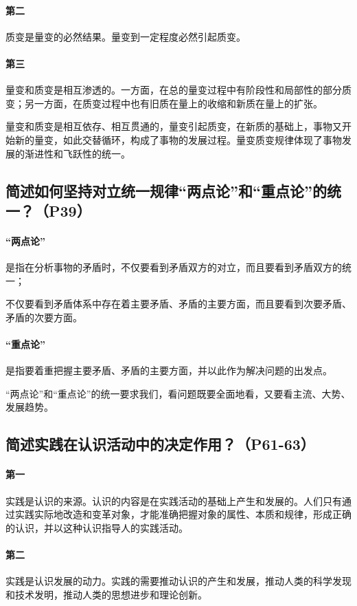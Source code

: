 \documentclass[UTF8]{ctexart}
\begin{document}
			\paragraph{第二}
				质变是量变的必然结果。量变到一定程度必然引起质变。\par
			\paragraph{第三}
				量变和质变是相互渗透的。一方面，在总的量变过程中有阶段性和局部性的部分质变；另一方面，在质变过程中也有旧质在量上的收缩和新质在量上的扩张。\par
			量变和质变是相互依存、相互贯通的，量变引起质变，在新质的基础上，事物又开始新的量变，如此交替循环，构成了事物的发展过程。量变质变规律体现了事物发展的渐进性和飞跃性的统一。
		\subsection{简述如何坚持对立统一规律“两点论”和“重点论”的统一？（P39）}
			\paragraph{“两点论”}
				是指在分析事物的矛盾时，不仅要看到矛盾双方的对立，而且要看到矛盾双方的统一；\par
				不仅要看到矛盾体系中存在着主要矛盾、矛盾的主要方面，而且要看到次要矛盾、矛盾的次要方面。
			\paragraph{“重点论”}
				是指要着重把握主要矛盾、矛盾的主要方面，并以此作为解决问题的出发点。\par
				“两点论”和“重点论”的统一要求我们，看问题既要全面地看，又要看主流、大势、发展趋势。
		\subsection{简述实践在认识活动中的决定作用？（P61-63）}
			\paragraph{第一}
				实践是认识的来源。认识的内容是在实践活动的基础上产生和发展的。人们只有通过实践实际地改造和变革对象，才能准确把握对象的属性、本质和规律，形成正确的认识，并以这种认识指导人的实践活动。
			\paragraph{第二}
				实践是认识发展的动力。实践的需要推动认识的产生和发展，推动人类的科学发现和技术发明，推动人类的思想进步和理论创新。
\end{document}
